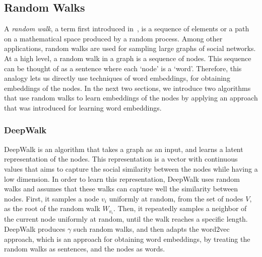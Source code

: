 \subsection{Random Walks}

A \emph{random walk}, a term first introduced in~\cite{pearson1905problem},
is a sequence of elements or a path on a mathematical space
produced by a random process. Among other applications, random walks are used
for sampling large graphs of social networks.
At a high level, a random walk in a graph is a sequence of nodes. This sequence
can be thought of as a sentence where each `node' is a `word'. Therefore, this
analogy lets us directly use techniques of word embeddings, for obtaining
embeddings of the nodes. In the next two sections, we introduce
two algorithms that use random walks to learn embeddings of the nodes
by applying an approach that was introduced for learning word embeddings.

\subsubsection{DeepWalk}

DeepWalk is an algorithm that takes a graph as an input, and learns a latent
representation of the nodes. This representation is a vector with continuous
values that aims to capture the social similarity between the nodes while having 
a low dimension. In order to learn this representation, DeepWalk uses random 
walks and assumes that these walks can capture well the similarity between 
nodes. First, it samples a node $v_i$ uniformly at random, from the set of nodes 
$V$, as the root of the random walk $W_{v_i}$. Then, it repeatedly samples 
a neighbor of the current node uniformly at random, until the walk reaches a 
specific length. DeepWalk produces $\gamma$ such random 
walks, and then adapts the word2vec approach, which is an approach for obtaining 
word embeddings, by treating the random walks as sentences, and the nodes as 
words.

